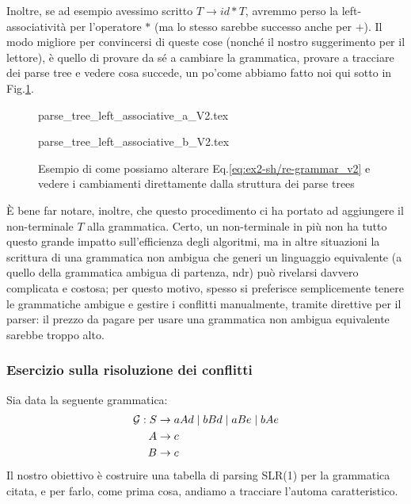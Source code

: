 \documentclass[class=book, crop=false, oneside, 12pt]{standalone}
\begin{document}
Inoltre, se ad esempio avessimo scritto \(T \to id * T\), avremmo perso la left-associatività per l'operatore \(\ast\) (ma lo stesso sarebbe successo anche per \(+\)). Il modo migliore per convincersi di queste cose (nonché il nostro suggerimento per il lettore), è quello di provare da sé a cambiare la grammatica, provare a tracciare dei parse tree e vedere cosa succede, un po'come abbiamo fatto noi qui sotto in Fig.\ref{fig:ex2-sh_re-altgrm-ptree}.
\begin{figure}[H]
    \begin{minipage}[b]{.4\textwidth}
        \centering
        {parse_tree_left_associative_a_V2.tex}
        \label{fig:ex2-sh_re-altgrm-ptree_1}
    \end{minipage}
    \hfill
    \begin{minipage}[b]{.4\textwidth}
        \centering
        {parse_tree_left_associative_b_V2.tex}
        \label{fig:ex2-sh_re-altgrm-ptree_2}
    \end{minipage}
    \caption{Esempio di come possiamo alterare Eq.\ref{eq:ex2-sh/re-grammar_v2} e vedere i cambiamenti direttamente dalla struttura dei parse trees}
    \label{fig:ex2-sh_re-altgrm-ptree}
\end{figure}

È bene far notare, inoltre, che questo procedimento ci ha portato ad aggiungere il non-terminale \(T\) alla grammatica. Certo, un non-terminale in più non ha tutto questo grande impatto sull'efficienza degli algoritmi, ma in altre situazioni la scrittura di una grammatica non ambigua che generi un linguaggio equivalente (a quello della grammatica ambigua di partenza, ndr) può rivelarsi davvero complicata e costosa; per questo motivo, spesso si preferisce semplicemente tenere le grammatiche ambigue e gestire i conflitti manualmente, tramite direttive per il parser: il prezzo da pagare per usare una grammatica non ambigua equivalente sarebbe troppo alto.

\subsubsection{Esercizio sulla risoluzione dei conflitti}
Sia data la seguente grammatica:
\begin{align}
    \label{eq:ex3-slr1-grammarr}
    \mathcal{G}: S &\to aAd \mid bBd \mid aBe \mid bAe \\
    A &\to c \nonumber \\ \notag
    B &\to c \notag
\end{align}
Il nostro obiettivo è costruire una tabella di parsing SLR(1) per la grammatica citata, e per farlo, come prima cosa, andiamo a tracciare l'automa caratteristico.
\end{document}
